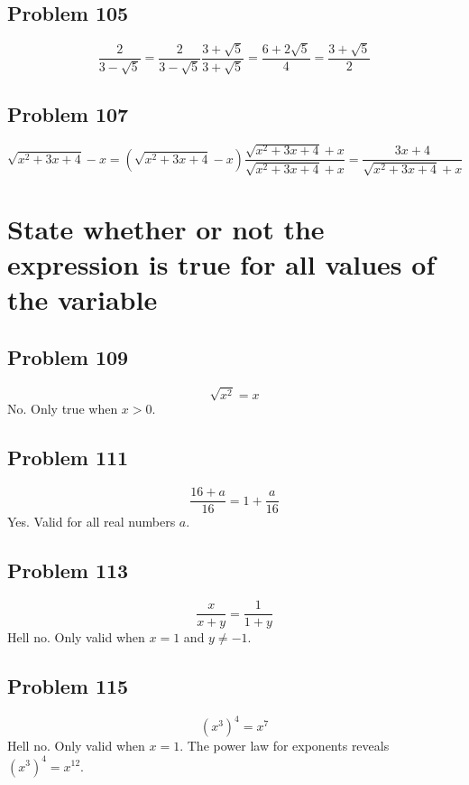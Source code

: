 \documentclass[11pt, oneside]{article}   	%
\begin{document}
\subsection{Problem 105}
$$\frac{2} {3-\sqrt{5}} 
= \frac{2} {3-\sqrt{5}} \frac{3+\sqrt{5}} {3+\sqrt{5}} 
= \frac{6 + 2 \sqrt{5}} {4}
= \frac{3+\sqrt{5}} {2}$$

\subsection{Problem 107}
$$\sqrt{x^2+3 x+4}-x 
= \left(\sqrt{x^2+3 x+4}-x\right) \frac{\sqrt{x^2+3 x+4}+x} {\sqrt{x^2+3 x+4}+x}
= \frac{3x+4} {\sqrt{x^2+3 x+4}+x}$$

\section{State whether or not the expression is true for all values of the variable}

\subsection{Problem 109}
$$\sqrt{x^{2}}=x$$
\noindent No. Only true when $x>0$. 

\subsection{Problem 111}
$$\frac{16+a}{16} = 1+\frac{a}{16}$$
\noindent Yes. Valid for all real numbers $a$.

\subsection{Problem 113}
$$\frac{x}{x+y} = \frac{1}{1+y}$$
\noindent Hell no. Only valid when $x=1$ and $y\ne-1$.

\subsection{Problem 115}
$$\left( x^{3} \right)^{4} = x^{7}$$
\noindent Hell no. Only valid when $x=1$. The power law for exponents reveals $\left( x^{3} \right)^{4} = x^{12}$.
\end{document}
